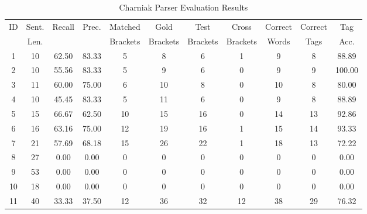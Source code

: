 \begin{table*}[htbp!]
\centering
\begin{tabular}{@{}ccccccccccc@{}}
\toprule
ID & Sent. & Recall & Prec. & Matched & Gold & Test & Cross & Correct & Correct & Tag \\
 & Len. & & & Brackets & Brackets & Brackets & Brackets & Words & Tags & Acc. \\
\midrule
1 & 10 & 62.50 & 83.33 & 5 & 8 & 6 & 1 & 9 & 8 & 88.89 \\
2 & 10 & 55.56 & 83.33 & 5 & 9 & 6 & 0 & 9 & 9 & 100.00 \\
3 & 11 & 60.00 & 75.00 & 6 & 10 & 8 & 0 & 10 & 8 & 80.00 \\
4 & 10 & 45.45 & 83.33 & 5 & 11 & 6 & 0 & 9 & 8 & 88.89 \\
5 & 15 & 66.67 & 62.50 & 10 & 15 & 16 & 0 & 14 & 13 & 92.86 \\
6 & 16 & 63.16 & 75.00 & 12 & 19 & 16 & 1 & 15 & 14 & 93.33 \\
7 & 21 & 57.69 & 68.18 & 15 & 26 & 22 & 1 & 18 & 13 & 72.22 \\
8 & 27 & 0.00 & 0.00 & 0 & 0 & 0 & 0 & 0 & 0 & 0.00 \\
9 & 53 & 0.00 & 0.00 & 0 & 0 & 0 & 0 & 0 & 0 & 0.00 \\
10 & 18 & 0.00 & 0.00 & 0 & 0 & 0 & 0 & 0 & 0 & 0.00 \\
11 & 40 & 33.33 & 37.50 & 12 & 36 & 32 & 12 & 38 & 29 & 76.32 \\
\bottomrule
\end{tabular}
\caption{Charniak Parser Evaluation Results}
\label{tab:parser_eval}
\end{table*}
